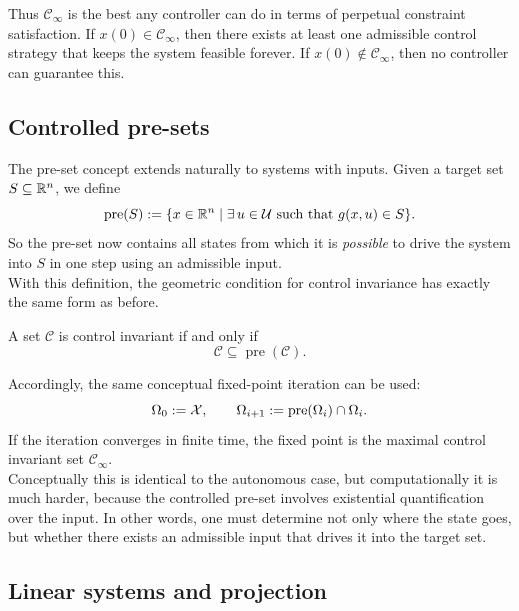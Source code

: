 Thus \(\mathcal C_\infty\) is the best any controller can do in terms of perpetual constraint
satisfaction. If \(x(0)\in \mathcal C_\infty\), then there exists at least one admissible control strategy
that keeps the system feasible forever. If \(x(0)\notin \mathcal C_\infty\), then no controller can
guarantee this.

\subsection{Controlled pre-sets}

The pre-set concept extends naturally to systems with inputs. Given a target set \(S\subseteq \mathbb{R}^n\),
we define
\[
\operatorname{pre}(S):=
\{x\in \mathbb{R}^n \mid \exists\,u\in \mathcal{U} \text{ such that } g(x,u)\in S\}.
\]
So the pre-set now contains all states from which it is \emph{possible} to drive the system into \(S\)
in one step using an admissible input.\\
With this definition, the geometric condition for control invariance has exactly the same form as
before.

\begin{theorembox}
A set \(\mathcal C\) is control invariant if and only if
\[
\mathcal C \subseteq \operatorname{pre}(\mathcal C).
\]
\end{theorembox}

Accordingly, the same conceptual fixed-point iteration can be used:
\[
\Omega_0:=\mathcal{X},
\qquad
\Omega_{i+1}:=\operatorname{pre}(\Omega_i)\cap \Omega_i.
\]
If the iteration converges in finite time, the fixed point is the maximal control invariant set
\(\mathcal C_\infty\).\\

Conceptually this is identical to the autonomous case, but computationally it is much harder,
because the controlled pre-set involves existential quantification over the input. In other words,
one must determine not only where the state goes, but whether there exists an admissible input
that drives it into the target set.

\subsection{Linear systems and projection}

